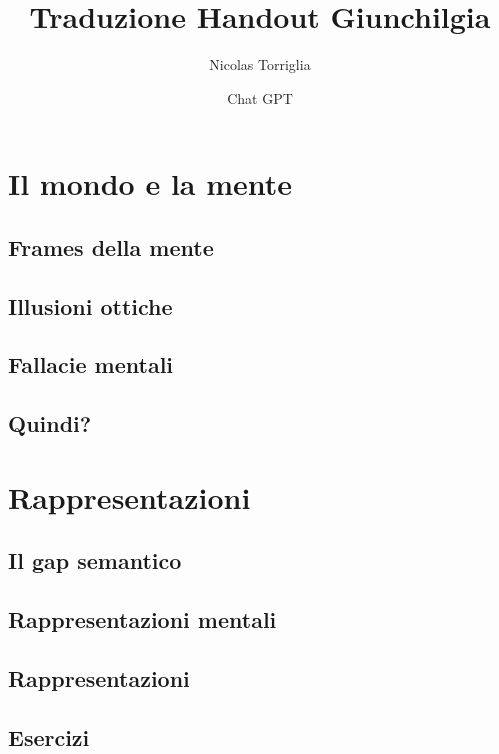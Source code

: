\documentclass{report}
\begin{document}
\begin{titlepage}
    \title{Traduzione Handout Giunchilgia}

\author{
    Nicolas Torriglia\\
    \and
    Chat GPT\\
}
\date{}

\maketitle
\end{titlepage}


\newpage



\cleardoublepage
\setcounter{page}{2}
\tableofcontents

\chapter{Il mondo e la mente}
\section{Frames della mente} 
\section{Illusioni ottiche}
\section{Fallacie mentali}
\section{Quindi?}

\chapter{Rappresentazioni}
\section{Il gap semantico}
\section{Rappresentazioni mentali}
\section{Rappresentazioni}
\section{Esercizi}
\end{document}

